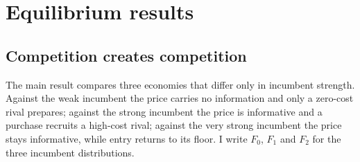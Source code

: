 \section{Equilibrium results}\label{sec:results}

\subsection{Competition creates competition}\label{sec:ccc}

The main result compares three economies that differ only in incumbent strength. Against the weak incumbent the
price carries no information and only a zero-cost rival prepares; against the strong incumbent the price is
informative and a purchase recruits a high-cost rival; against the very strong incumbent the price stays
informative, while entry returns to its floor. I write \(F_0\), \(F_1\) and \(F_2\) for the three incumbent
distributions.

